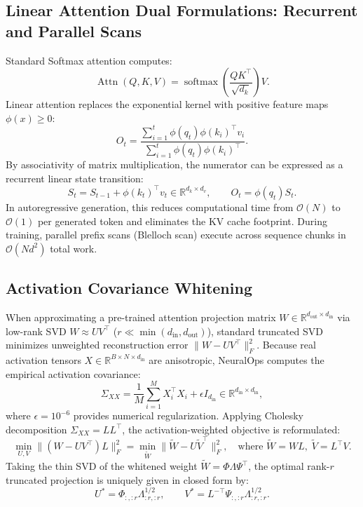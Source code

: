 \documentclass{article}
\begin{document}
\subsection{Linear Attention Dual Formulations: Recurrent and Parallel Scans}
Standard Softmax attention computes:
\begin{equation}
    \operatorname{Attn}(Q, K, V) = \operatorname{softmax}\left(\frac{Q K^\top}{\sqrt{d_k}}\right) V.
\end{equation}
Linear attention replaces the exponential kernel with positive feature maps $\phi(x) \ge 0$:
\begin{equation}
    O_t = \frac{\sum_{i=1}^t \phi(q_t) \phi(k_i)^\top v_i}{\sum_{i=1}^t \phi(q_t) \phi(k_i)^\top}.
\end{equation}
By associativity of matrix multiplication, the numerator can be expressed as a recurrent linear state transition:
\begin{equation}
    S_t = S_{t-1} + \phi(k_t)^\top v_t \in \mathbb{R}^{d_k \times d_v}, \qquad O_t = \phi(q_t) S_t.
\end{equation}
In autoregressive generation, this reduces computational time from $\mathcal{O}(N)$ to $\mathcal{O}(1)$ per generated token and eliminates the KV cache footprint. During training, parallel prefix scans (Blelloch scan) execute across sequence chunks in $\mathcal{O}(N d^2)$ total work.

\subsection{Activation Covariance Whitening}
When approximating a pre-trained attention projection matrix $W \in \mathbb{R}^{d_{\text{out}} \times d_{\text{in}}}$ via low-rank SVD $W \approx U V^\top$ ($r \ll \min(d_{\text{in}}, d_{\text{out}})$), standard truncated SVD minimizes unweighted reconstruction error $\|W - U V^\top\|_F^2$. Because real activation tensors $X \in \mathbb{R}^{B \times N \times d_{\text{in}}}$ are anisotropic, NeuralOps computes the empirical activation covariance:
\begin{equation}
    \Sigma_{XX} = \frac{1}{M} \sum_{i=1}^M X_i^\top X_i + \epsilon I_{d_{\text{in}}} \in \mathbb{R}^{d_{\text{in}} \times d_{\text{in}}},
\end{equation}
where $\epsilon = 10^{-6}$ provides numerical regularization. Applying Cholesky decomposition $\Sigma_{XX} = L L^\top$, the activation-weighted objective is reformulated:
\begin{equation}
    \min_{U, V} \|(W - U V^\top) L\|_F^2 = \min_{\tilde{W}} \|\tilde{W} - U \tilde{V}^\top\|_F^2, \quad \text{where } \tilde{W} = W L, \; \tilde{V} = L^\top V.
\end{equation}
Taking the thin SVD of the whitened weight $\tilde{W} = \Phi \Lambda \Psi^\top$, the optimal rank-$r$ truncated projection is uniquely given in closed form by:
\begin{equation}
    U^* = \Phi_{:, :r} \Lambda_{:r, :r}^{1/2}, \qquad V^* = L^{-\top} \Psi_{:, :r} \Lambda_{:r, :r}^{1/2}.
\end{equation}
\end{document}
